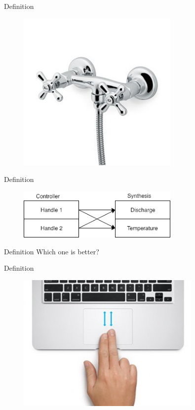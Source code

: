 \documentclass{beamer}
\begin{document}
\begin{frame}{Definition}
    \begin{figure}[h]
        \includegraphics[width=0.7\textwidth]{grifo2.jpg}
    \end{figure}
\end{frame}

\begin{frame}{Definition}
    \begin{figure}[h]
        \includegraphics[width=0.7\textwidth]{grifo2_scheme.png}
    \end{figure}
\end{frame}

\begin{frame}{Definition}
    Which one is better?
\end{frame}

\begin{frame}{Definition}
    \begin{figure}[h]
        \includegraphics[width=0.8\textwidth]{scroll.jpg}
    \end{figure}
\end{frame}
\end{document}
